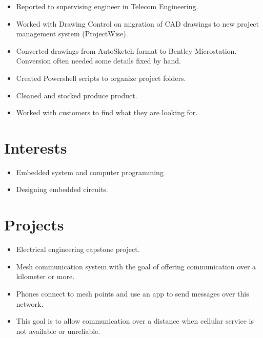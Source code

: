 \documentclass{lsanche_cv}
\begin{document}
\begin{multicols*}{2}
    \divider

    \begin{itemize}
      \item Reported to supervising engineer in Telecom Engineering.
      \item Worked with Drawing Control on migration of CAD drawings to new project management system (ProjectWise).
      \item Converted drawings from AutoSketch format to Bentley Microstation. Conversion often needed some details fixed by hand.
      \item Created Powershell scripts to organize project folders.
    \end{itemize}

    \divider
    
    \begin{itemize}
      \item Cleaned and stocked produce product.
      \item Worked with customers to find what they are looking for.
    \end{itemize}

    \columnbreak
    
  \section{Interests}
    \begin{itemize}
      \item Embedded system and computer programming
      \item Designing embedded circuits.
    \end{itemize}

    \section{Projects}

      \begin{itemize}
        \item Electrical engineering capstone project.
        \item Mesh communication system with the goal of offering communication over a kilometer or more. 
        \item Phones connect to mesh points and use an app to send messages over this network.
        \item This goal is to allow communication over a distance when cellular service is not available or unreliable.
      \end{itemize}


\end{multicols*}
\end{document}
